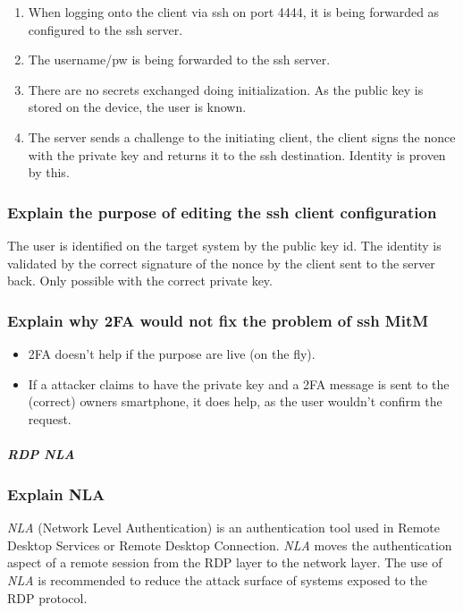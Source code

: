\begin{enumerate}
    \item When logging onto the client via ssh on port 4444, it is being forwarded as configured to the ssh server.
    \item The username/pw is being forwarded to the ssh server.
    \item There are no secrets exchanged doing initialization. As the public key is stored on the device, the user is \glqq known\grqq.
    \item The server sends a challenge to the initiating client, the client signs the nonce with the private key and returns it to the ssh destination. Identity is proven by this.
\end{enumerate}

\subsubsection{Explain the purpose of editing the ssh client configuration}
The user is identified on the target system by the public key id. The identity is validated by the correct signature of the nonce by the client sent to the server back. Only possible with the correct private key.

\subsubsection{Explain why 2FA would not fix the problem of ssh MitM}
\begin{itemize}
    \item 2FA doesn't help if the purpose are live (on the fly).
    \item If a attacker claims to have the private key and a 2FA message is sent to the (correct) owners smartphone, it does help, as the user wouldn't confirm the request.
\end{itemize}

\subparagraph{RDP NLA}

\subsubsection{Explain NLA}
\textit{NLA} (Network Level Authentication) is an authentication tool used in Remote Desktop Services or Remote Desktop Connection.
\textit{NLA} moves the authentication aspect of a remote session from the RDP layer to the network layer. The use of \textit{NLA} is recommended to reduce the attack surface of systems exposed to the RDP protocol.\\

